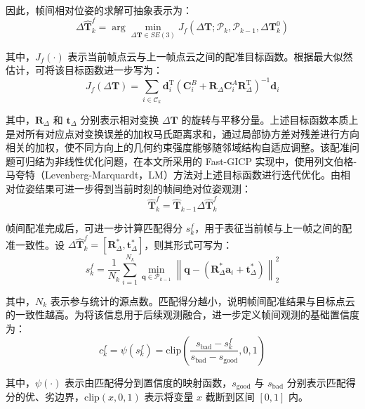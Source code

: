 因此，帧间相对位姿的求解可抽象表示为：
\begin{equation}
\Delta \hat{\mathbf{T}}_{k}^{f}
=
\arg \min_{\Delta \mathbf{T}\in SE(3)}
J_{f}\left(\Delta \mathbf{T};\mathcal{P}_{k},\mathcal{P}_{k-1},\Delta \mathbf{T}_{k}^{0}\right)
\end{equation}

其中，$J_{f}(\cdot)$ 表示当前帧点云与上一帧点云之间的配准目标函数。根据最大似然估计，可将该目标函数进一步写为：
\begin{equation}
J_{f}\left(\Delta \mathbf{T}\right)
=
\sum_{i\in \mathcal{C}_{k}}
\mathbf{d}_{i}^{\mathrm{T}}
\left(
\mathbf{C}_{i}^{B}
+
\mathbf{R}_{\Delta}
\mathbf{C}_{i}^{A}
\mathbf{R}_{\Delta}^{\mathrm{T}}
\right)^{-1}
\mathbf{d}_{i}
\end{equation}

其中，$\mathbf{R}_{\Delta}$ 和 $\mathbf{t}_{\Delta}$ 分别表示相对变换 $\Delta \mathbf{T}$ 的旋转与平移分量。上述目标函数本质上是对所有对应点对变换误差的加权马氏距离求和，通过局部协方差对残差进行方向相关的加权，使不同方向上的几何约束强度能够随邻域结构自适应调整。该配准问题可归结为非线性优化问题，在本文所采用的 Fast-GICP 实现中，使用列文伯格-马夸特（Levenberg-Marquardt，LM）方法对上述目标函数进行迭代优化。由相对位姿结果可进一步得到当前时刻的帧间绝对位姿观测：
\begin{equation}
\hat{\mathbf{T}}_{k}^{f}
=
\hat{\mathbf{T}}_{k-1}\Delta \hat{\mathbf{T}}_{k}^{f}
\end{equation}

帧间配准完成后，可进一步计算匹配得分 $s_{k}^{f}$，用于表征当前帧与上一帧之间的配准一致性。设 $\Delta \hat{\mathbf{T}}_{k}^{f}=[\mathbf{R}_{\Delta}^{\ast},\mathbf{t}_{\Delta}^{\ast}]$，则其形式可写为：
\begin{equation}
s_{k}^{f}
=
\frac{1}{N_k}
\sum_{i=1}^{N_k}
\min_{\mathbf{q}\in \mathcal{P}_{k-1}}
\left\|
\mathbf{q}
-\left(
\mathbf{R}_{\Delta}^{\ast}\mathbf{a}_i+\mathbf{t}_{\Delta}^{\ast}
\right)
\right\|_2^2
\end{equation}

其中，$N_k$ 表示参与统计的源点数。匹配得分越小，说明帧间配准结果与目标点云的一致性越高。为将该信息用于后续观测融合，进一步定义帧间观测的基础置信度为：
\begin{equation}
c_{k}^{f}
=
\psi\!\left(s_{k}^{f}\right)
=
\mathrm{clip}
\left(
\frac{s_{\mathrm{bad}}-s_{k}^{f}}{s_{\mathrm{bad}}-s_{\mathrm{good}}},
0,1
\right)
\end{equation}

其中，$\psi(\cdot)$ 表示由匹配得分到置信度的映射函数，$s_{\mathrm{good}}$ 与 $s_{\mathrm{bad}}$ 分别表示匹配得分的优、劣边界，$\mathrm{clip}(x,0,1)$ 表示将变量 $x$ 截断到区间 $[0,1]$ 内。

